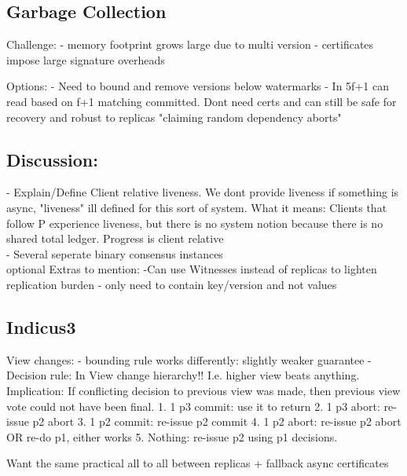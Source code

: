 \subsection{Garbage Collection}
Challenge:
- memory footprint grows large due to multi version
- certificates impose large signature overheads

Options:
- Need to bound and remove versions below watermarks
- In 5f+1 can read based on f+1 matching committed. Dont need certs and can still be safe for recovery and robust to replicas "claiming random dependency aborts"


\subsection{Discussion: }
- Explain/Define Client relative liveness. We dont provide liveness if something is async, "liveness" ill defined for this sort of system. What it means: Clients that follow P experience liveness, but there is no system notion because there is no shared total ledger.  Progress is client relative\\
- Several seperate binary consensus instances \\


optional Extras to mention:
-Can use Witnesses instead of replicas to lighten replication burden
- only need to contain key/version and not values


\subsection{Indicus3}



View changes:
- bounding rule works differently: slightly weaker guarantee
- Decision rule: In View change hierarchy!! I.e. higher view beats anything. Implication: If conflicting decision to previous view was made, then previous view vote could not have been final.
	1. 1 p3 commit: use it to return
	2. 1 p3 abort: re-issue p2 abort 
	3. 1 p2 commit: re-issue p2 commit
	4. 1 p2 abort: re-issue p2 abort OR re-do p1, either works
	5. Nothing: re-issue p2 using p1 decisions.
	
Want the same practical all to all between replicas + fallback async certificates 